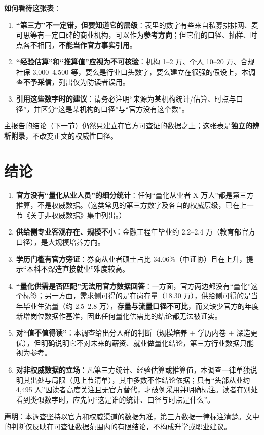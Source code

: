 \documentclass[UTF8,11pt]{ctexart}
\begin{document}
\noindent\textbf{如何看待这张表}：
\begin{enumerate}[itemsep=2pt]
\item \textbf{“第三方”不一定错，但要知道它的层级}：表里的数字有些来自私募排排网、麦可思等有一定口碑的商业机构，可以作为\textbf{参考方向}；但它们的口径、抽样、时点各不相同，\textbf{不能当作官方事实引用}。
\item \textbf{“经验估算”和“推算值”应视为不可核验}：机构 1--2 万、个人 10--20 万、合规社保 3,000--4,500 等，要么是行业口头数字，要么建立在很强的假设上，本调查\textbf{不予采信}，列出仅为防读者误用。
\item \textbf{引用这些数字时的建议}：请务必注明“来源为某机构统计/估算、时点与口径”，并区分“这是某机构的口径”与“官方没有这个数”。
\end{enumerate}

主报告的结论（下一节）仍然只建立在官方可查证的数据之上；这张表是\textbf{独立的辨析附录}，不改变正文的权威性口径。

\section{结论}

\begin{enumerate}[itemsep=2pt]
\item \textbf{官方没有“量化从业人员”的细分统计}：任何“量化从业者 X 万人”都是第三方推算，不是权威数据。（这类常见的第三方数字及各自的权威层级，已在上一节《关于非权威数据》集中列出。）
\item \textbf{供给侧专业客观存在、规模不小}：金融工程年毕业约 2.2--2.4 万（教育部官方口径），是大规模培养方向。
\item \textbf{学历门槛有官方旁证}：券商从业者硕士占比 34.06\%（中证协）且在上升，提示“本科不深造直接就业”难度较高。
\item \textbf{“量化供需是否匹配”无法用官方数据回答}：一方面，官方两边都没有“量化”这个标签；另一方面，需求侧可得的是在岗存量（18.30 万），供给侧可得的是当年毕业生流量（约 2.5--2.8 万），\textbf{存量与流量口径不可比}，而又缺少官方的年度新增岗位数据作基准，因此任何量化供需比的结论都无法被证实。
\item \textbf{对“值不值得读”}：本调查给出分人群的判断（规模培养 + 学历内卷 + 深造更优），但明确说明它不对未来的薪资、就业做量化结论，第三方行业数据只能视为参考。
\item \textbf{对非权威数据的立场}：凡第三方统计、经验估算或推算值，本调查一律单独说明其出处与局限（见上节清单），其中多数不作结论依据；只有“头部从业约 4,495 人”因读者高度关注且无官方替代，才破例采用并明确标注。读者在别处看到类似数字时，应先问“这是谁的统计、口径与时点是什么”。
\end{enumerate}

\noindent\textbf{声明}：本调查坚持以官方和权威渠道的数据为准，第三方数据一律标注清楚。文中的判断仅反映在可查证数据范围内的有限结论，不构成升学或职业建议。
\end{document}
